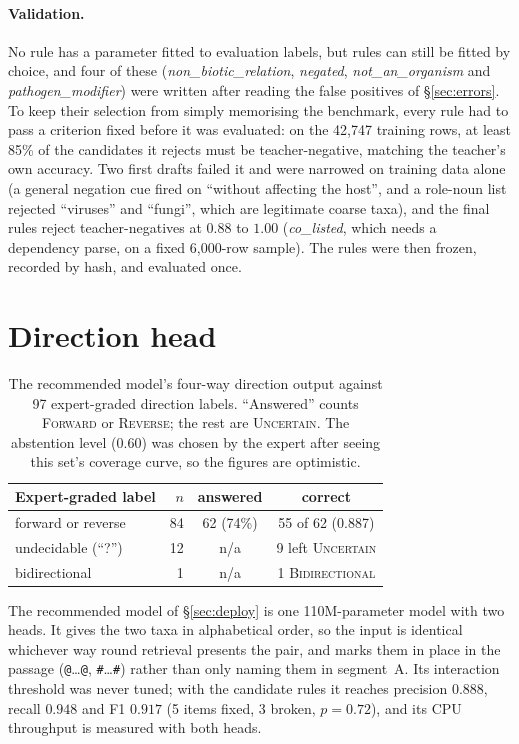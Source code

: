 \documentclass[11pt]{article}
\begin{document}
\paragraph{Validation.}
No rule has a parameter fitted to evaluation labels, but rules can still be fitted by choice,
and four of these (\emph{non\_biotic\_relation}, \emph{negated}, \emph{not\_an\_organism} and
\emph{pathogen\_modifier}) were written after reading the false positives of \S\ref{sec:errors}. To
keep their selection from simply memorising the benchmark, every rule had to pass a criterion fixed
before it was evaluated: on the 42{,}747 training rows, at least 85\% of the candidates it rejects
must be teacher-negative, matching the teacher's own accuracy. Two first drafts failed it and were
narrowed on training data alone (a general negation cue fired on ``without affecting the host'', and
a role-noun list rejected ``viruses'' and ``fungi'', which are legitimate coarse taxa), and the
final rules reject teacher-negatives at $0.88$ to $1.00$ (\emph{co\_listed}, which needs a dependency
parse, on a fixed 6{,}000-row sample). The rules were then frozen, recorded by hash, and evaluated
once.

\section{Direction head}
\label{app:direction}

\begin{table}[t]\centering\small
\setlength{\tabcolsep}{3.6pt}
\begin{tabular}{lrcc}
\toprule
Expert-graded label & $n$ & answered & correct \\
\midrule
forward or reverse     & 84 & 62 (74\%) & 55 of 62 (0.887) \\
undecidable (``?'')    & 12 & n/a & 9 left \textsc{Uncertain} \\
bidirectional          &  1 & n/a & 1 \textsc{Bidirectional} \\
\bottomrule
\end{tabular}
\caption{The recommended model's four-way direction output against 97 expert-graded direction
labels. ``Answered'' counts \textsc{Forward} or \textsc{Reverse}; the rest are \textsc{Uncertain}.
The abstention level ($0.60$) was chosen by the expert after seeing this set's coverage curve, so
the figures are optimistic.}
\label{tab:direction}
\end{table}

The recommended model of \S\ref{sec:deploy} is one 110M-parameter model with two heads. It gives the
two taxa in alphabetical order, so the input is identical whichever way round retrieval presents the
pair, and marks them in place in the passage (\texttt{@}\ldots\texttt{@},
\texttt{\#}\ldots\texttt{\#}) rather than only naming them in segment~A. Its interaction threshold
was never tuned; with the candidate rules it reaches precision $0.888$, recall $0.948$ and F1
$0.917$ (5 items fixed, 3 broken, $p = 0.72$), and its CPU throughput is measured with both heads.
\end{document}
